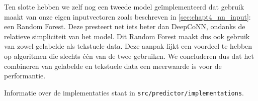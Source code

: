 Ten slotte hebben we zelf nog een tweede model geïmplementeerd dat gebruik maakt van onze eigen inputvectoren zoals beschreven in \autoref{sec:chapt4_nn_input}: een Random Forest. Deze presteert net iets beter dan DeepCoNN, ondanks de relatieve simpliciteit van het model. Dit Random Forest maakt dus ook gebruik van zowel gelabelde als tekstuele data. Deze aanpak lijkt een voordeel te hebben op algoritmen die slechts één van de twee gebruiken. We concluderen dus dat het combineren van gelabelde en tekstuele data een meerwaarde is voor de performantie.

Informatie over de implementaties staat in \verb|src/predictor/implementations|.
